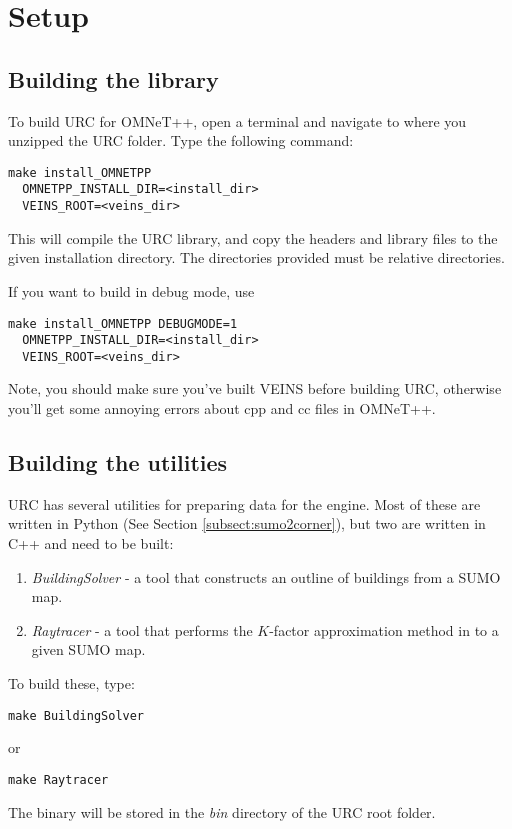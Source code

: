 \section{Setup}

\subsection{Building the library}
To build URC for OMNeT++, open a terminal and navigate to where you unzipped the URC folder. Type the following command:
\begin{lstlisting}[frame=single]
 make install_OMNETPP 
  OMNETPP_INSTALL_DIR=<install_dir>
  VEINS_ROOT=<veins_dir>
\end{lstlisting}
This will compile the URC library, and copy the headers and library files to the given installation directory. The directories provided must be relative directories.

If you want to build in debug mode, use 
\begin{lstlisting}[frame=single]
 make install_OMNETPP DEBUGMODE=1
  OMNETPP_INSTALL_DIR=<install_dir>
  VEINS_ROOT=<veins_dir>
\end{lstlisting}

Note, you should make sure you've built VEINS before building URC, otherwise you'll get some annoying errors about cpp and cc files in OMNeT++.

\subsection{Building the utilities}

URC has several utilities for preparing data for the engine. Most of these are written in Python (See Section \ref{subsect:sumo2corner}), but two are written in C++ and need to be built: \begin{enumerate}
 \item \textit{BuildingSolver} - a tool that constructs an outline of buildings from a SUMO map.
 \item \textit{Raytracer} - a tool that performs the $K$-factor approximation method in \cite{cooper_dynamic_2014} to a given SUMO map.
\end{enumerate}

To build these, type:
\begin{lstlisting}[frame=single]
 make BuildingSolver
\end{lstlisting}
or
\begin{lstlisting}[frame=single]
 make Raytracer
\end{lstlisting}

The binary will be stored in the \textit{bin} directory of the URC root folder.
